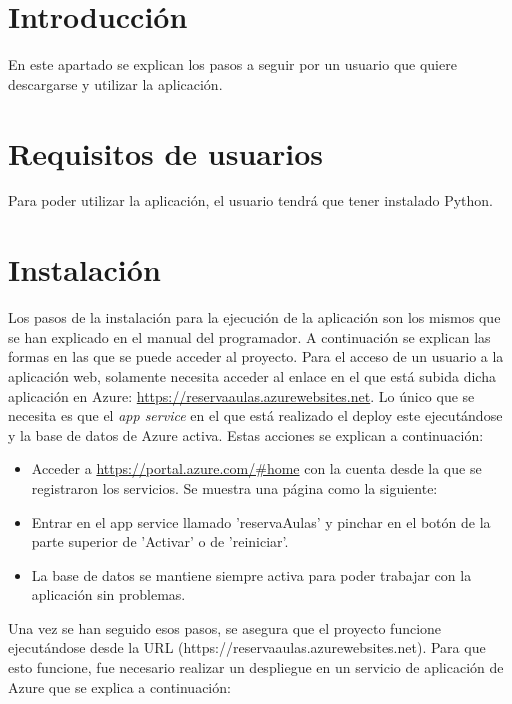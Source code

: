 
\section{Introducción}
En este apartado se explican los pasos a seguir por un usuario que quiere descargarse y utilizar la aplicación.
\section{Requisitos de usuarios}
Para poder utilizar la aplicación, el usuario tendrá que tener instalado Python. 
\section{Instalación}
Los pasos de la instalación para la ejecución de la aplicación son los mismos que se han explicado en el manual del programador. A continuación se explican las formas en las que se puede acceder al proyecto.\newline
Para el acceso de un usuario a la aplicación web, solamente necesita acceder al enlace en el que está subida dicha aplicación en Azure:\newline
\url{https://reservaaulas.azurewebsites.net}.
\newline
Lo único que se necesita es que el \textit{app service} en el que está realizado el deploy este ejecutándose y la base de datos de Azure activa. Estas acciones se explican a continuación:\newline
\begin{itemize}
    \item Acceder a \url{https://portal.azure.com/#home} con la cuenta  desde la que se registraron los servicios. Se muestra una página como la siguiente:\newline
    \item Entrar en el app service llamado 'reservaAulas' y pinchar en el botón de la parte superior de 'Activar' o de 'reiniciar'.\newline
    \item La base de datos se mantiene siempre activa para poder trabajar con la aplicación sin problemas.
\end{itemize}
Una vez se han seguido esos pasos, se asegura que el proyecto funcione ejecutándose desde la URL (https://reservaaulas.azurewebsites.net).
Para que esto funcione, fue necesario realizar un despliegue en un servicio de aplicación de Azure que se explica a continuación:\newline
